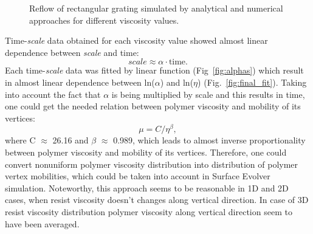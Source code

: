 \documentclass[12pt, letterpaper]{article}
\begin{document}
\begin{figure}[h!]
	\vspace{-4em}
	
	\caption{Reflow of rectangular grating simulated by analytical and numerical approaches for different viscosity values.}
	\label{fig:gratings}
\end{figure}


Time-\textit{scale} data obtained for each viscosity value showed almost linear dependence between \textit{scale} and time:
\begin{equation}
	scale \approx \alpha \cdot \text{time}.
\end{equation}
Each time-\textit{scale} data was fitted by linear function (Fig~\ref{fig:alphas}) which result in almost linear dependence between ln(\textit{$\alpha$}) and ln($\eta$) (Fig.~\ref{fig:final_fit}). Taking into account the fact that $\alpha$ is being multiplied by scale and this results in time, one could get the needed relation between polymer viscosity and mobility of its vertices:
\begin{equation}
	\mu = C / \eta^\beta,
\end{equation}
where C $\approx$ 26.16 and $\beta$ $\approx$ 0.989, which leads to almost inverse proportionality between polymer viscosity and mobility of its vertices. Therefore, one could convert nonuniform polymer viscosity distribution into distribution of polymer vertex mobilities, which could be taken into account in Surface Evolver simulation. Noteworthy, this approach seems to be reasonable in 1D and 2D cases, when resist viscosity doesn't changes along vertical direction. In case of 3D resist viscosity distribution polymer viscosity along vertical direction seem to have been averaged.
\end{document}
